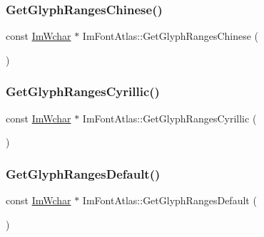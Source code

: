 \mbox{\label{struct_im_font_atlas_afc5807dd42b3a644a9a1e0a95c13cb08}} 
\subsubsection{\texorpdfstring{Get\+Glyph\+Ranges\+Chinese()}{GetGlyphRangesChinese()}}
{\footnotesize\ttfamily const \mbox{\hyperlink{imgui_8h_af2c7badaf05a0008e15ef76d40875e97}{Im\+Wchar}} $\ast$ Im\+Font\+Atlas\+::\+Get\+Glyph\+Ranges\+Chinese (\begin{DoxyParamCaption}{ }\end{DoxyParamCaption})}

\mbox{\label{struct_im_font_atlas_a5aaff3357d9ed401ce451c39942e869e}} 
\subsubsection{\texorpdfstring{Get\+Glyph\+Ranges\+Cyrillic()}{GetGlyphRangesCyrillic()}}
{\footnotesize\ttfamily const \mbox{\hyperlink{imgui_8h_af2c7badaf05a0008e15ef76d40875e97}{Im\+Wchar}} $\ast$ Im\+Font\+Atlas\+::\+Get\+Glyph\+Ranges\+Cyrillic (\begin{DoxyParamCaption}{ }\end{DoxyParamCaption})}

\mbox{\label{struct_im_font_atlas_adec0df140eb1dc01c2a22a5253d62820}} 
\subsubsection{\texorpdfstring{Get\+Glyph\+Ranges\+Default()}{GetGlyphRangesDefault()}}
{\footnotesize\ttfamily const \mbox{\hyperlink{imgui_8h_af2c7badaf05a0008e15ef76d40875e97}{Im\+Wchar}} $\ast$ Im\+Font\+Atlas\+::\+Get\+Glyph\+Ranges\+Default (\begin{DoxyParamCaption}{ }\end{DoxyParamCaption})}

